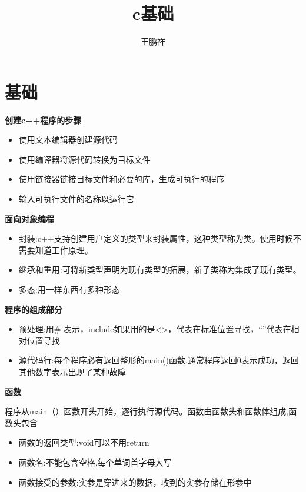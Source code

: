 \documentclass{article}
\begin{document}
\title{c基础}
\author{王鹏祥}
\date{\chntoday}
\maketitle
\tableofcontents
\newpage

\section{基础}
\textbf{创建c++程序的步骤}
\begin{itemize}
\item 使用文本编辑器创建源代码
\item 使用编译器将源代码转换为目标文件
\item 使用链接器链接目标文件和必要的库，生成可执行的程序
\item 输入可执行文件的名称以运行它
\end{itemize}

\textbf{面向对象编程}
\begin{itemize}
\item 封装:c++支持创建用户定义的类型来封装属性，这种类型称为类。使用时候不需要知道工作原理。
\item 继承和重用:可将新类型声明为现有类型的拓展，新子类称为集成了现有类型。
\item 多态:用一样东西有多种形态
\end{itemize}

\textbf{程序的组成部分}
\begin{itemize}
\item 预处理:用\# 表示，include如果用的是<>，代表在标准位置寻找，“”代表在相对位置寻找
\item 源代码行:每个程序必有返回整形的main()函数.通常程序返回0表示成功，返回其他数字表示出现了某种故障
\end{itemize}

\textbf{函数} \par
程序从main（）函数开头开始，逐行执行源代码。函数由函数头和函数体组成,函数头包含
\begin{itemize}
\item 函数的返回类型:void可以不用return
\item 函数名:不能包含空格,每个单词首字母大写
\item 函数接受的参数:实参是穿进来的数据，收到的实参存储在形参中
\end{itemize}
\end{document}
